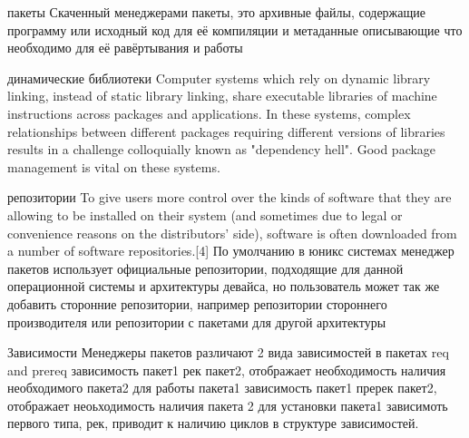 пакеты
Скаченный менеджерами пакеты, это архивные файлы, содержащие программу или исходный код для её компиляции и метаданные описывающие что необходимо для её равёртывания и работы 

динамические библиотеки
Computer systems which rely on dynamic library linking, instead of static library linking, share executable libraries of machine instructions across packages and applications. In these systems, complex relationships between different packages requiring different versions of libraries results in a challenge colloquially known as "dependency hell".  Good package management is vital on these systems.

репозитории 
To give users more control over the kinds of software that they are allowing to be installed on their system (and sometimes due to legal or convenience reasons on the distributors' side), software is often downloaded from a number of software repositories.[4]
По умолчанию в юникс системах менеджер пакетов использует официальные репозитории, подходящие для данной операционной системы и архитектуры девайса, но пользователь может так же добавить сторонние репозитории, например репозитории стороннего производителя или репозитории с пакетами для другой архитектуры

Зависимости
Менеджеры пакетов различают 2 вида зависимостей в пакетах req and prereq
зависимость  пакет1 рек пакет2, отображает необходимость наличия необходимого пакета2 для работы пакета1
зависимость пакет1 пререк пакет2, отображает неоьходимость наличия пакета 2 для установки пакета1
зависимоть первого типа, рек, приводит к наличию циклов в структуре зависимостей.
\fi


